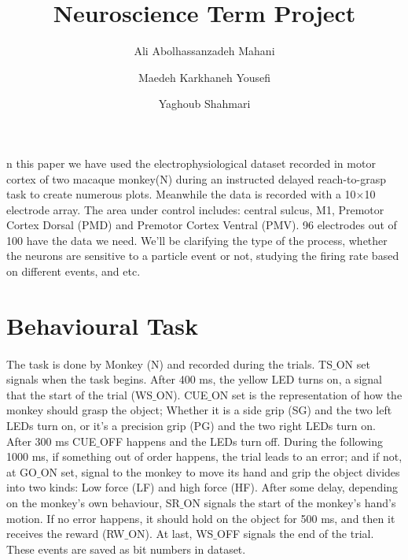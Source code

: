 \documentclass[9pt,twocolumn]{paper-template}
\title{Neuroscience Term Project}
\author[a]{Ali Abolhassanzadeh Mahani}
\author[a]{Maedeh Karkhaneh Yousefi}
\author[a]{Yaghoub Shahmari}
\affil[a]{Student, Physics Department, Sharif University of Technology}
\begin{document}
\maketitle
\thispagestyle{firststyle}

n this paper we have used the electrophysiological dataset recorded in motor cortex of two macaque monkey(N) during an instructed delayed reach-to-grasp task to create numerous plots. Meanwhile the data is recorded with a 10$ \times $10 electrode array. The area under control includes: central sulcus, M1, Premotor Cortex Dorsal (PMD) and Premotor Cortex Ventral (PMV). 96 electrodes out of 100 have the data we need.
We'll be clarifying the type of the process, whether the neurons are sensitive to a particle event or not, studying the firing rate based on different events, and etc. \citep{dataset}
\section*{Behavioural Task}
\paragraph*{}
The task is done by Monkey (N) and recorded during the trials. TS$ \_ $ON set signals when the task begins. After 400 ms, the yellow LED turns on, a signal that the start of the trial (WS$ \_ $ON). CUE$ \_ $ON set is the representation of how the monkey should grasp the object; Whether it is a side grip (SG) and the two left LEDs turn on, or it's a precision grip (PG) and the two right LEDs turn on. After 300 ms CUE$ \_ $OFF happens and the LEDs turn off. During the following 1000 ms, if something out of order happens, the trial leads to an error; and if not, at GO$ \_ $ON set, signal to the monkey to move its hand and grip the object divides into two kinds: Low force (LF) and high force (HF). After some delay, depending on the monkey's own behaviour, SR$ \_ $ON signals the start of the monkey's hand's motion. If no error happens, it should hold on the object for 500 ms, and then it receives the reward (RW$ \_ $ON). At last, WS$ \_ $OFF signals the end of the trial. These events are saved as bit numbers in dataset.
\end{document}
